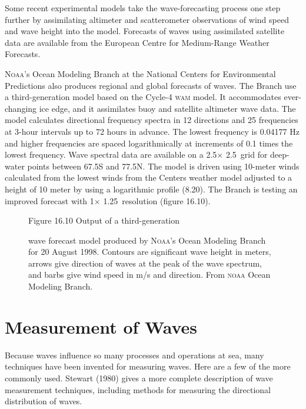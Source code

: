 Some recent experimental models take the wave-forecasting process one step further by assimilating altimeter and scatterometer observations of wind speed and wave height into the model. Forecasts of waves using assimilated satellite data are available from the European Centre for Medium-Range Weather Forecasts.

\textsc{Noaa}'s Ocean Modeling Branch at the National Centers for Environmental Predictions also produces regional and global forecasts of waves. The Branch use a third-generation model based on the Cycle-4 \textsc{wam} model. It accommodates ever-changing ice edge, and it assimilates buoy and
satellite altimeter wave data. The model calculates directional frequency spectra in 12 directions and 25 frequencies at 3-hour intervals up to 72 hours in advance. The lowest frequency is 0.04177 Hz and higher frequencies are spaced logarithmically at increments of 0.1 times the lowest frequency. Wave spectral data are available on a 2.5\degrees $\times$ 2.5\degrees\ grid for deep-water points between 67.5\degrees S and 77.5\degrees N.  The model is driven using 10-meter winds calculated from the lowest winds from the Centers weather model adjusted to a height of 10 meter by using a logarithmic profile (8.20). The Branch is testing an improved forecast with 1\degrees $\times$ 1.25\degrees\ resolution (figure 16.10).

\begin{figure} [t!]
\footnotesize
Figure 16.10 Output of a third-generation \rule{0pt}{4ex}wave forecast model
produced by
\textsc{Noaa}'s Ocean Modeling Branch for 20 August 1998. Contours are
significant wave height in meters, arrows give direction of waves at the peak
of the wave spectrum, and barbs give wind speed in m/s and direction. From
\textsc{noaa} Ocean Modeling Branch.
\label{fig:noaa.waves}
\vspace{-4ex}
\end{figure}

\section{Measurement of Waves}
Because waves influence so many processes and operations at sea, many techniques have been invented for measuring waves. Here are a few of the more commonly used. Stewart (1980) gives a more complete description of wave measurement techniques, including methods for measuring the directional distribution of waves.

